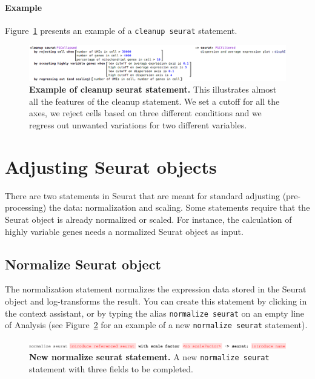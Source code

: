 \paragraph{Example} Figure~\ref{fig:ExampleCleanupSeurat} presents an example of a
\texttt{cleanup seurat} statement.

\begin{figure}[h!tbp]
  \centering
  \includegraphics[width=\figWidthWide]{figures/ExampleCleanupSeurat.png}
    \caption[Example of cleanup seurat statement.]{\textbf{Example of cleanup seurat statement.}
    This illustrates almost all the features of the cleanup statement. We set a cutoff for
    all the axes, we reject cells based on three different conditions and we regress out
    unwanted variations for two different variables.}
\label{fig:ExampleCleanupSeurat}
\end{figure}

\section{Adjusting Seurat objects}
There are two statements in Seurat that are meant for standard adjusting
(pre-processing) the data: normalization and scaling. Some statements require that the
Seurat object is already normalized or scaled. For instance, the calculation of highly
variable genes needs a normalized Seurat object as input.

\subsection{Normalize Seurat object}\label{sec:NormalizeSeurat}
The normalization statement normalizes the expression data stored in the Seurat object and
log-transforms the result. You can create this statement by clicking
 in the context assistant, or by typing
the alias \texttt{normalize seurat} on an empty line of Analysis (see Figure~\ref{fig:NormalizeSeurat}
for an example of a new \texttt{normalize seurat} statement).

\begin{figure}[h!tbp]
  \centering
  \includegraphics[width=\figWidthWide]{figures/NormalizeSeurat.pdf}
    \caption[New normalize seurat statement.]{\textbf{New normalize seurat statement.}
    A new \texttt{normalize seurat} statement with three fields to be completed.}
\label{fig:NormalizeSeurat}
\end{figure}

